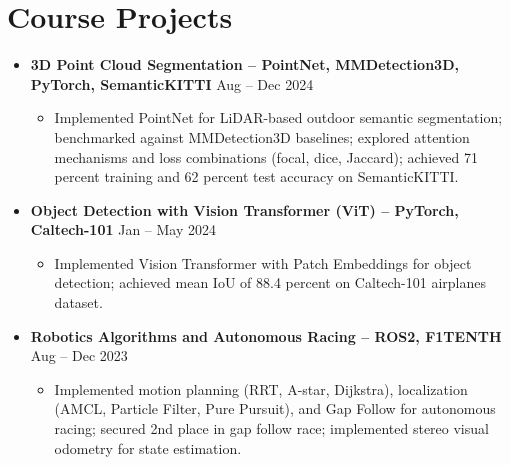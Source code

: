 \documentclass[letterpaper,10.5pt]{article}
\newcommand{\entryheading}[4]{%
  \vspace{2pt}%
  {\bfseries #1} \hfill #2 \\%
  {\itshape #3} \hfill {\itshape #4}%
  \vspace{-4pt}%
}
\newcommand{\projectheading}[2]{%
  \vspace{2pt}%
  {\bfseries #1} \hfill #2%
  \vspace{-4pt}%
}
\newcommand{\resumeItemListStart}{%
  \begin{itemize}[leftmargin=0.2in, itemsep=-1pt, topsep=2pt, label={--}]\small%
}
\newcommand{\resumeItemListEnd}{\end{itemize}\vspace{-2pt}}
\newcommand{\resumeItem}[1]{\item #1}
\newcommand{\sectionliststart}{\begin{itemize}[leftmargin=0in, label={}, itemsep=2pt]}
\newcommand{\sectionlistend}{\end{itemize}}
\begin{document}

\section{Course Projects}
\sectionliststart
  \item
    \projectheading{3D Point Cloud Segmentation -- PointNet, MMDetection3D, PyTorch, SemanticKITTI}{Aug -- Dec 2024}
    \resumeItemListStart
      \resumeItem{Implemented PointNet for LiDAR-based outdoor semantic segmentation; benchmarked against MMDetection3D baselines; explored attention mechanisms and loss combinations (focal, dice, Jaccard); achieved 71 percent training and 62 percent test accuracy on SemanticKITTI.}
    \resumeItemListEnd

  \item
    \projectheading{Object Detection with Vision Transformer (ViT) -- PyTorch, Caltech-101}{Jan -- May 2024}
    \resumeItemListStart
      \resumeItem{Implemented Vision Transformer with Patch Embeddings for object detection; achieved mean IoU of 88.4 percent on Caltech-101 airplanes dataset.}
    \resumeItemListEnd

  \item
    \projectheading{Robotics Algorithms and Autonomous Racing -- ROS2, F1TENTH}{Aug -- Dec 2023}
    \resumeItemListStart
      \resumeItem{Implemented motion planning (RRT, A-star, Dijkstra), localization (AMCL, Particle Filter, Pure Pursuit), and Gap Follow for autonomous racing; secured 2nd place in gap follow race; implemented stereo visual odometry for state estimation.}
    \resumeItemListEnd
\sectionlistend

\end{document}
